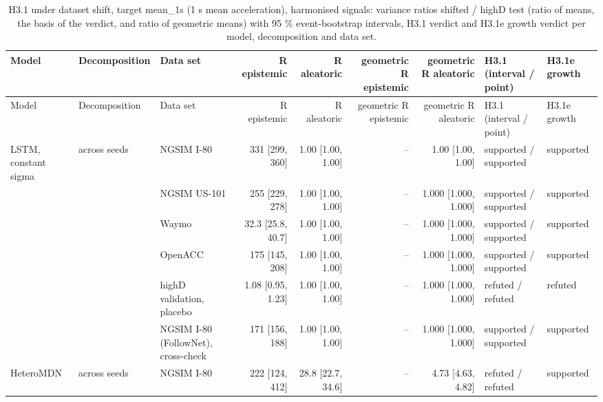 \begingroup
\footnotesize
\begin{longtable}{lllrrrrll}
\caption{H3.1 under dataset shift, target mean\_1s (1 s mean acceleration), harmonised signals: variance ratios shifted / highD test (ratio of means, the basis of the verdict, and ratio of geometric means) with 95 \% event-bootstrap intervals, H3.1 verdict and H3.1e growth verdict per model, decomposition and data set.}\label{tab:t2-h31--harmonised--mean-1s} \\
\toprule
Model & Decomposition & Data set & R epistemic & R aleatoric & geometric R epistemic & geometric R aleatoric & H3.1 (interval / point) & H3.1e growth \\
\midrule
\endfirsthead
\toprule
Model & Decomposition & Data set & R epistemic & R aleatoric & geometric R epistemic & geometric R aleatoric & H3.1 (interval / point) & H3.1e growth \\
\midrule
\endhead
\bottomrule
\endlastfoot
LSTM, constant sigma & across seeds & NGSIM I-80 & 331 [299, 360] & 1.00 [1.00, 1.00] & -- & 1.00 [1.00, 1.00] & supported / supported & supported \\
 &  & NGSIM US-101 & 255 [229, 278] & 1.00 [1.00, 1.00] & -- & 1.000 [1.000, 1.000] & supported / supported & supported \\
 &  & Waymo & 32.3 [25.8, 40.7] & 1.00 [1.00, 1.00] & -- & 1.000 [1.000, 1.000] & supported / supported & supported \\
 &  & OpenACC & 175 [145, 208] & 1.00 [1.00, 1.00] & -- & 1.000 [1.000, 1.000] & supported / supported & supported \\
 &  & highD validation, placebo & 1.08 [0.95, 1.23] & 1.00 [1.00, 1.00] & -- & 1.000 [1.000, 1.000] & refuted / refuted & refuted \\
 &  & NGSIM I-80 (FollowNet), cross-check & 171 [156, 188] & 1.00 [1.00, 1.00] & -- & 1.000 [1.000, 1.000] & supported / supported & supported \\
\midrule
HeteroMDN & across seeds & NGSIM I-80 & 222 [124, 412] & 28.8 [22.7, 34.6] & -- & 4.73 [4.63, 4.82] & refuted / refuted & supported \\

\end{longtable}
